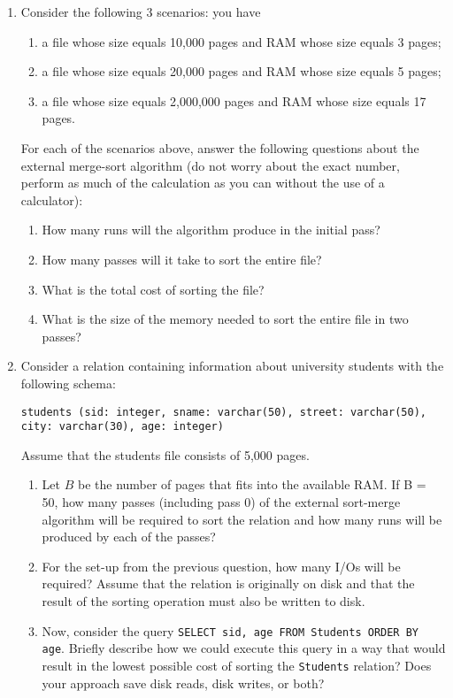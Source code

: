\documentclass[12pt]{article}
\begin{document}
\begin{enumerate}
  \item Consider the following 3 scenarios: you have
    \begin{enumerate}
    \item a file whose size equals 10,000 pages and RAM whose size
      equals 3 pages;
    \item a file whose size equals 20,000 pages and RAM whose size
      equals 5 pages;
    \item a file whose size equals 2,000,000 pages and RAM whose size
      equals 17 pages.
    \end{enumerate}
    For each of the scenarios above, answer the following questions
    about the external merge-sort algorithm (do not worry about the
    exact number, perform as much of the calculation as you can
    without the use of a calculator):
    \begin{enumerate}[label=(\roman*)]
    \item How many runs will the algorithm produce in the initial
      pass?
    \item How many passes will it take to sort the entire file?
    \item What is the total cost of sorting the file?
    \item What is the size of the memory needed to sort the entire
      file in two passes?
    \end{enumerate}

  \item Consider a relation containing information about university
    students with the following schema:

    \bigskip
    \texttt{students (sid: integer, sname: varchar(50), \linebreak street:
      varchar(50), city: varchar(30), age: integer)}
    \bigskip

    Assume that the students file consists of 5,000 pages.

    \begin{enumerate}[label=(\roman*)]
    \item Let $B$ be the number of pages that fits into the available
      RAM. If B = 50, how many passes (including pass 0) of the
      external sort-merge algorithm will be required to sort the
      relation and how many runs will be produced by each of the
      passes?
    \item For the set-up from the previous question, how many I/Os
      will be required?  Assume that the relation is originally on
      disk and that the result of the sorting operation must also be
      written to disk.
    \item Now, consider the query \texttt{SELECT sid, age FROM
        Students ORDER BY age}.  Briefly describe how we could execute
        this query in a way that would result in the lowest possible
        cost of sorting the \texttt{Students} relation?  Does your approach
        save disk reads, disk writes, or both?
      \end{enumerate}
      


\end{enumerate}
\end{document}
